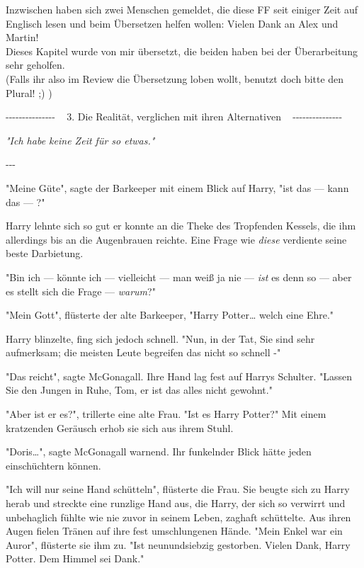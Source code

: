 

\hypertarget{die-realituxe4t-verglichen-mit-ihren-alternativen}{%

Inzwischen haben sich zwei Menschen gemeldet, die diese FF seit einiger Zeit auf Englisch lesen und beim Übersetzen helfen wollen: Vielen Dank an Alex und Martin!\\ Dieses Kapitel wurde von mir übersetzt, die beiden haben bei der Überarbeitung sehr geholfen.\\ (Falls ihr also im Review die Übersetzung loben wollt, benutzt doch bitte den Plural! ;) )

-\/-\/-\/-\/-\/-\/-\/-\/-\/-\/-\/-\/-\/-\/- ~ 3. Die Realität, verglichen mit ihren Alternativen ~ -\/-\/-\/-\/-\/-\/-\/-\/-\/-\/-\/-\/-\/-\/-

\emph{"Ich habe keine Zeit für so etwas."}

-\/-\/-

"Meine Güte", sagte der Barkeeper mit einem Blick auf Harry, "ist das --- kann das --- ?"

Harry lehnte sich so gut er konnte an die Theke des Tropfenden Kessels, die ihm allerdings bis an die Augenbrauen reichte. Eine Frage wie \emph{diese} verdiente seine beste Darbietung.

"Bin ich --- könnte ich --- vielleicht --- man weiß ja nie --- \emph{ist} es denn so --- aber es stellt sich die Frage --- \emph{warum}?"

"Mein Gott", flüsterte der alte Barkeeper, "Harry Potter… welch eine Ehre."

Harry blinzelte, fing sich jedoch schnell. "Nun, in der Tat, Sie sind sehr aufmerksam; die meisten Leute begreifen das nicht so schnell -"

"Das reicht", sagte McGonagall. Ihre Hand lag fest auf Harrys Schulter. "Lassen Sie den Jungen in Ruhe, Tom, er ist das alles nicht gewohnt."

"Aber ist er es?", trillerte eine alte Frau. "Ist es Harry Potter?" Mit einem kratzenden Geräusch erhob sie sich aus ihrem Stuhl.

"Doris…", sagte McGonagall warnend. Ihr funkelnder Blick hätte jeden einschüchtern können.

"Ich will nur seine Hand schütteln", flüsterte die Frau. Sie beugte sich zu Harry herab und streckte eine runzlige Hand aus, die Harry, der sich so verwirrt und unbehaglich fühlte wie nie zuvor in seinem Leben, zaghaft schüttelte. Aus ihren Augen fielen Tränen auf ihre fest umschlungenen Hände. "Mein Enkel war ein Auror", flüsterte sie ihm zu. "Ist neunundsiebzig gestorben. Vielen Dank, Harry Potter. Dem Himmel sei Dank."

}
